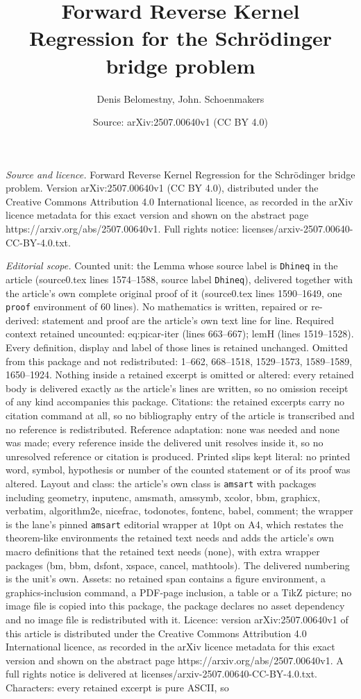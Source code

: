 \documentclass[10pt,a4paper]{amsart}
\title[Forward Reverse Kernel Regression for the Schr\"{o}dinger br]{Forward Reverse Kernel Regression for the Schr\"{o}dinger bridge problem}
\author{Denis Belomestny, John. Schoenmakers}
\date{Source: arXiv:2507.00640v1 (CC BY 4.0)}
\begin{document}
\maketitle

\noindent\emph{Source and licence.} Forward Reverse Kernel Regression for the Schr\"{o}dinger bridge problem. Version arXiv:2507.00640v1 (CC BY 4.0), distributed under the Creative Commons Attribution 4.0 International licence, as recorded in the arXiv licence metadata for this exact version and shown on the abstract page https://arxiv.org/abs/2507.00640v1. Full rights notice: licenses/arxiv-2507.00640-CC-BY-4.0.txt.\par\smallskip

\noindent\textit{Editorial scope.} Counted unit: the Lemma whose source label is \texttt{Dhineq} in the article (source0.tex lines 1574--1588, source label \texttt{Dhineq}), delivered together with the article's own complete original proof of it (source0.tex lines 1590--1649, one \texttt{proof} environment of 60 lines). No mathematics is written, repaired or re-derived: statement and proof are the article's own text line for line. Required context retained uncounted: eq:picar-iter (lines 663--667); lemH (lines 1519--1528). Every definition, display and label of those lines is retained unchanged. Omitted from this package and not redistributed: 1--662, 668--1518, 1529--1573, 1589--1589, 1650--1924. Nothing inside a retained excerpt is omitted or altered: every retained body is delivered exactly as the article's lines are written, so no omission receipt of any kind accompanies this package. Citations: the retained excerpts carry no citation command at all, so no bibliography entry of the article is transcribed and no reference is redistributed. Reference adaptation: none was needed and none was made; every reference inside the delivered unit resolves inside it, so no unresolved reference or citation is produced. Printed slips kept literal: no printed word, symbol, hypothesis or number of the counted statement or of its proof was altered. Layout and class: the article's own class is \texttt{amsart} with packages including geometry, inputenc, amsmath, amssymb, xcolor, bbm, graphicx, verbatim, algorithm2e, nicefrac, todonotes, fontenc, babel, comment; the wrapper is the lane's pinned \texttt{amsart} editorial wrapper at 10pt on A4, which restates the theorem-like environments the retained text needs and adds the article's own macro definitions that the retained text needs (none), with extra wrapper packages (bm, bbm, dsfont, xspace, cancel, mathtools). The delivered numbering is the unit's own. Assets: no retained span contains a figure environment, a graphics-inclusion command, a PDF-page inclusion, a table or a TikZ picture; no image file is copied into this package, the package declares no asset dependency and no image file is redistributed with it. Licence: version arXiv:2507.00640v1 of this article is distributed under the Creative Commons Attribution 4.0 International licence, as recorded in the arXiv licence metadata for this exact version and shown on the abstract page https://arxiv.org/abs/2507.00640v1. A full rights notice is delivered at licenses/arxiv-2507.00640-CC-BY-4.0.txt. Characters: every retained excerpt is pure ASCII, so 
\end{document}
